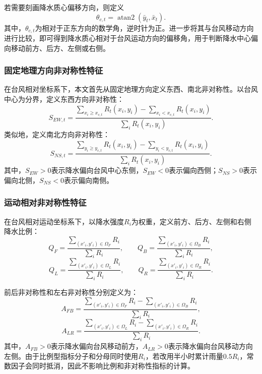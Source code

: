 \documentclass[UTF8,a4paper,zihao=5]{ctexart}
\numberwithin{equation}{section}
\numberwithin{figure}{section}
\numberwithin{table}{section}
\begin{document}
若需要刻画降水质心偏移方向，则定义
\begin{equation}
    \theta_{c,t}=\operatorname{atan2}(\bar{y}_t,\bar{x}_t).
\end{equation}
其中，$\theta_{c,t}$为相对于正东方向的数学角，逆时针为正。进一步将其与台风移动方向进行比较，即可得到降水质心相对于台风运动方向的偏移角，用于判断降水中心偏向移动前方、后方、左侧或右侧。

\subsubsection{固定地理方向非对称性特征}

在台风相对坐标系下，本文首先从固定地理方向定义东西、南北非对称性。以台风中心为分界，定义东西方向非对称性：
\begin{equation}
    S_{EW,t}=
    \frac{\sum_{x_i\geq x_{c,t}}R_t(x_i,y_i)-\sum_{x_i<x_{c,t}}R_t(x_i,y_i)}
    {\sum_i R_t(x_i,y_i)}.
\end{equation}
类似地，定义南北方向非对称性：
\begin{equation}
    S_{NS,t}=
    \frac{\sum_{y_i\geq y_{c,t}}R_t(x_i,y_i)-\sum_{y_i<y_{c,t}}R_t(x_i,y_i)}
    {\sum_i R_t(x_i,y_i)}.
\end{equation}
其中，$S_{EW}>0$表示降水偏向台风中心东侧，$S_{EW}<0$表示偏向西侧；$S_{NS}>0$表示偏向北侧，$S_{NS}<0$表示偏向南侧。

\subsubsection{运动相对非对称性特征}

在台风相对运动坐标系下，以降水强度$R_i$为权重，定义前方、后方、左侧和右侧降水比例：
\begin{equation}
    Q_F=\frac{\sum_{(x'_i,y'_i)\in\Omega_F}R_i}{\sum_i R_i},
    \qquad
    Q_B=\frac{\sum_{(x'_i,y'_i)\in\Omega_B}R_i}{\sum_i R_i},
\end{equation}
\begin{equation}
    Q_L=\frac{\sum_{(x'_i,y'_i)\in\Omega_L}R_i}{\sum_i R_i},
    \qquad
    Q_R=\frac{\sum_{(x'_i,y'_i)\in\Omega_R}R_i}{\sum_i R_i}.
\end{equation}

前后非对称性和左右非对称性分别定义为：
\begin{equation}
    A_{FB}=
    \frac{
    \sum_{(x'_i,y'_i)\in\Omega_F}R_i-
    \sum_{(x'_i,y'_i)\in\Omega_B}R_i
    }{\sum_i R_i},
\end{equation}
\begin{equation}
    A_{LR}=
    \frac{
    \sum_{(x'_i,y'_i)\in\Omega_L}R_i-
    \sum_{(x'_i,y'_i)\in\Omega_R}R_i
    }{\sum_i R_i}.
\end{equation}
其中，$A_{FB}>0$表示降水偏向台风移动前方，$A_{LR}>0$表示降水偏向台风移动方向左侧。由于比例型指标分子和分母同时使用$R_i$，若改用半小时累计雨量$0.5R_i$，常数因子会同时抵消，因此不影响比例和非对称性指标的计算。
\end{document}
